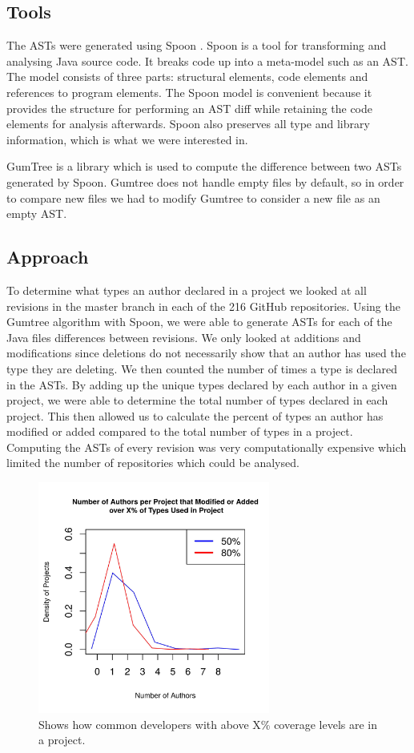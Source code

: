 \documentclass{sig-alternate-05-2015}
\begin{document}
\subsection{Tools}
The ASTs were generated using Spoon \cite{pawlak:hal-01169705}. Spoon is a tool for transforming and analysing Java source code. It breaks code up into a meta-model such as an AST. The model consists of three parts: structural elements, code elements and references to program elements. The Spoon model is convenient because it provides the structure for performing an AST diff while retaining the code elements for analysis afterwards. Spoon also preserves all type and library information, which is what we were interested in.

GumTree \cite{falleri:hal-01054552} is a library which is used to compute the difference between two ASTs generated by Spoon. Gumtree does not handle empty files by default, so in order to compare new files we had to modify Gumtree to consider a new file as an empty AST.

\subsection{Approach}
To determine what types an author declared in a project we looked at all revisions in the master branch in each of the 216 GitHub repositories. Using the Gumtree algorithm with Spoon, we were able to generate ASTs for each of the Java files differences between revisions. We only looked at additions and modifications since deletions do not necessarily show that an author has used the type they are deleting. We then counted the number of times a type is declared in the ASTs. By adding up the unique types declared by each author in a given project, we were able to determine the total number of types declared in each project. This then allowed us to calculate the percent of types an author has modified or added compared to the total number of types in a project. Computing the ASTs of every revision was very computationally expensive which limited the number of repositories which could be analysed.

\begin{figure}[t]
\centering
\includegraphics[height=3in, width=3in]{../lib_stats_Threshold_dist}
\caption{Shows how common developers with above X\% coverage levels are in a project.}
\label{lib_stats_Threshold_dist}
\end{figure}
\end{document}
